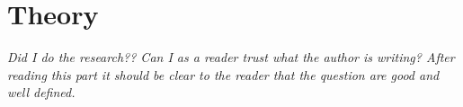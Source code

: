 \chapter{Theory}\label{cha:theory}

\textit{Did I do the research?? Can I as a reader trust what the author is writing? After reading this part it should be clear to the reader that the question are good and well defined.}











\newpage


